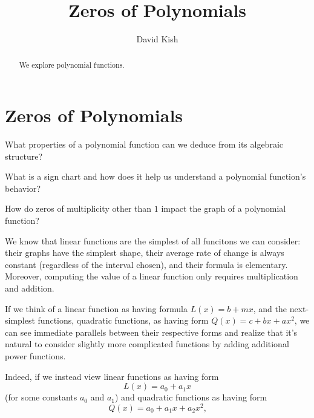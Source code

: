 \documentclass{ximera}
\author{David Kish}
\title{Zeros of Polynomials}
\begin{document}
\begin{abstract}
We explore polynomial functions.
\end{abstract}
\maketitle

%
%
%
\section{Zeros of Polynomials}
\begin{motivatingQuestions}
\item What properties of a polynomial function can we deduce from its algebraic structure?%
\item What is a sign chart and how does it help us understand a polynomial function's behavior?%
\item How do zeros of multiplicity other than $1$ impact the graph of a polynomial function?%
\end{motivatingQuestions}

We know that linear functions are the simplest of all funcitons we can consider:  their graphs have the simplest shape, their average rate of change is always constant (regardless of the interval chosen), and their formula is elementary.  Moreover, computing the value of a linear function only requires multiplication and addition.%

If we think of a linear function as having formula $L(x) = b + mx$, and the next-simplest functions, quadratic functions, as having form $Q(x) = c + bx + ax^2$, we can see immediate parallels between their respective forms and realize that it's natural to consider slightly more complicated functions by adding additional power functions.%

Indeed, if we instead view linear functions as having form%
\[
L(x) = a_0 + a_1 x
\]
(for some constants $a_0$ and $a_1$) and quadratic functions as having form%
\[
Q(x) = a_0 + a_1 x + a_2 x^2\text{,}
\]
\end{document}
